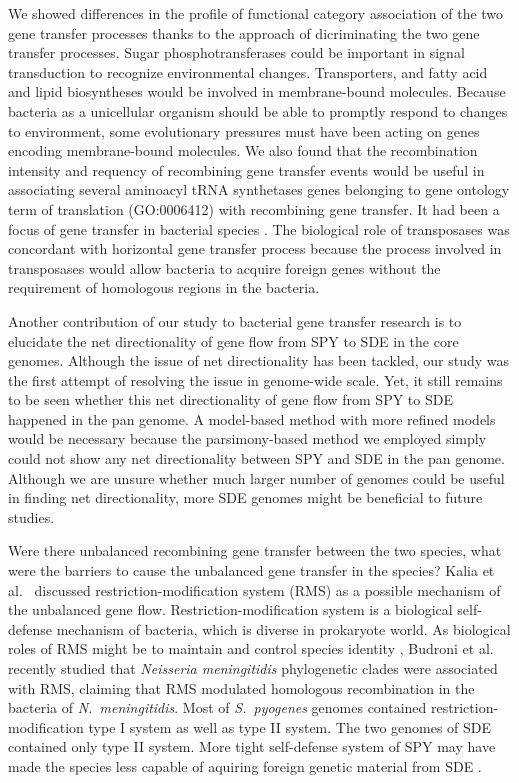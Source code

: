 \documentclass[10pt]{article}
\let\citep\cite
\let\citet\cite
\begin{document}
We showed differences in the profile of functional category association of the
two gene transfer processes thanks to the approach of dicriminating the two gene
transfer processes.  Sugar phosphotransferases could be important in signal
transduction to recognize environmental changes.  Transporters, and fatty acid
and lipid biosyntheses would be involved in membrane-bound molecules.  Because
bacteria as a unicellular organism should be able to promptly respond to changes
to environment, some evolutionary pressures must have been acting on genes
encoding membrane-bound molecules.  We also found that the recombination
intensity and requency of recombining gene transfer events would be useful in
associating several aminoacyl tRNA synthetases genes belonging to gene ontology
term of translation (GO:0006412) with recombining gene transfer. It had been a
focus of gene transfer in bacterial species \citep{Woese2000}.  The biological
role of transposases was concordant with horizontal gene transfer process
because the process involved in transposases would allow bacteria to acquire
foreign genes without the requirement of homologous regions in the bacteria.  

Another contribution of our study to bacterial gene transfer research is to
elucidate the net directionality of gene flow from SPY to SDE in the core
genomes. Although the issue of net directionality has been tackled, our study
was the first attempt of resolving the issue in genome-wide scale. Yet, it still
remains to be seen whether this net directionality of gene flow from SPY to SDE
happened in the pan genome. A model-based method with more refined models would
be necessary because the parsimony-based method we employed simply could not
show any net directionality between SPY and SDE in the pan genome. Although we
are unsure whether much larger number of genomes could be useful in finding net
directionality, more SDE genomes might be beneficial to future studies. 

Were there unbalanced recombining gene transfer between the two species, what
were the barriers \citep{Thomas2005} to cause the unbalanced gene transfer in
the species?  Kalia et al.\ \citet{Kalia2001} discussed restriction-modification
system (RMS) as a possible mechanism of the unbalanced gene flow.
Restriction-modification system is a biological self-defense mechanism of
bacteria, which is diverse in prokaryote world.  As biological roles of RMS
might be to maintain and control species identity \citep{Jeltsch2003}, Budroni
et al.\ \citet{Budroni2011a} recently studied that \textit{Neisseria
meningitidis} phylogenetic clades were associated with RMS, claiming that RMS
modulated homologous recombination in the bacteria of \textit{N.\ meningitidis}.
Most of \textit{S.\ pyogenes} genomes contained restriction-modification type I
system as well as type II system. The two genomes of SDE contained only type II
system. More tight self-defense system of SPY may have made the species less
capable of aquiring foreign genetic material from SDE \citep{Kalia2001}.
\end{document}
